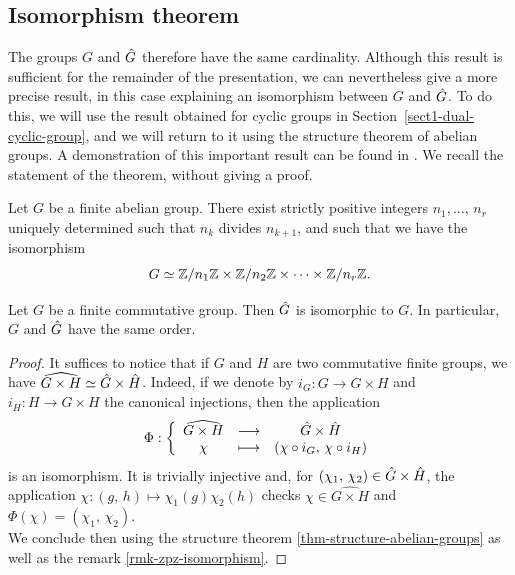 \subsection{Isomorphism theorem}
\label{sect2-thm-isomorphism}

The groups $G$ and $\hat{G}$ therefore have the same cardinality. Although this result is sufficient for the remainder of the presentation, we can nevertheless give a more precise result, in this case explaining an isomorphism between $G$ and $\hat{G}$. To do this, we will use the result obtained for cyclic groups in Section~\ref{sect1-dual-cyclic-group}, and we will return to it using the structure theorem of abelian groups. A demonstration of this important result can be found in  \cite{artin}. We recall the statement of the theorem, without giving a proof.

\begin{thm}
\label{thm-structure-abelian-groups}
 Let $G$ be a finite abelian group. There exist strictly positive integers $ n_1, \ldots, \, n_r $ uniquely determined such that $ n_k $ divides $ n_{k + 1}$, and such that we have the isomorphism
\begin{equation*}
G \simeq \mathbb{Z}/n_1 \mathbb{Z} \times \mathbb{Z}/n_2 \mathbb{Z} \times \cdots \times \mathbb{Z}/n_r \mathbb{Z}.
\end{equation*}

\end{thm}


\begin{cor}
\label{cor-thm-isomorphism}
 Let $G$ be a finite commutative group. Then $\hat{G}$ is isomorphic to $G$. In particular, $G$ and $\hat{G}$ have the same order.
\end{cor}
\begin{proof}
It suffices to notice that if $G$ and $H$ are two commutative finite groups, we have $\widehat{G \times H} \simeq \hat{G} \times \hat{H}$. Indeed, if we denote by $ i_G: G \rightarrow G \times H $ and $ i_H:H \rightarrow G \times H $ the canonical injections, then the application
\begin{equation*}
\Phi: {\left\{ \begin{array}{ccc} \widehat{G \times H} & \longrightarrow & \hat{G} \times \hat{H} \\ \chi & \longmapsto & (\chi \circ i_G, \, \chi \circ i_H) \end{array} \right.}
\end{equation*}
is an isomorphism. It is trivially injective and, for $(\chi_1, \, \chi_2) \in \hat{G} \times \hat{H}$, the application $\chi: (g, \, h) \mapsto \chi_1(g) \chi_2(h)$ checks $\chi \in \widehat{G \times H}$ and $\Phi(\chi) = (\chi_1, \, \chi_2)$. \\
We conclude then using the structure theorem \ref{thm-structure-abelian-groups} as well as the remark \ref{rmk-zpz-isomorphism}.
\end{proof}

